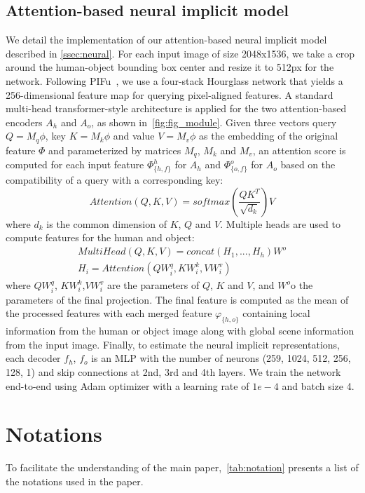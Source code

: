 \subsection{Attention-based neural implicit model}
We detail the implementation of our attention-based neural implicit model described in \cref{ssec:neural}. For each input image of size 2048x1536, we take a crop around the human-object bounding box center and resize it to 512px for the network. Following PIFu~\cite{pifu}, we use a four-stack Hourglass network that yields a 256-dimensional feature map for querying pixel-aligned features. A standard multi-head transformer-style architecture is applied for the two attention-based encoders  $A_h$ and $A_o$, as shown in~\cref{fig:fig_module}. Given three vectors query $Q=M_q\phi$, key $K=M_k\phi$ and value $V=M_v\phi$ as the embedding of the original feature $\Phi$ and parameterized by matrices $M_q$, $M_k$ and $M_v$, an attention score is computed for each input feature $\Phi^h_{\{h,f\}}$ for $A_h$ and $\Phi^o_{\{o,f\}}$ for $A_o$ based on the compatibility of a query with a corresponding key:
\begin{equation}
    Attention(Q,K,V)=softmax\left(\frac{QK^T}{\sqrt{d_k}}\right)V
\end{equation}
where $d_k$ is the common dimension of $K$, $Q$ and $V$. Multiple heads are used to compute features for the human and object:
\begin{equation}
\begin{gathered}
    MultiHead(Q, K, V)=concat(H_1, ..., H_h)W^o
    \\
    H_i=Attention(QW^q_i, KW^k_i,V W^v_i)
\end{gathered}
\end{equation}
where $QW^q_i$, $KW^k_i$,$V W^v_i$  are the parameters of $Q$, $K$ and $V$, and $W^o$o the parameters of the final projection. The final feature is computed as the mean of the processed features with each merged feature $\varphi_{\{h,o\}}$ containing local information from the human or object image along with global scene information from the input image. Finally, to estimate the neural implicit representations, each decoder $f_h$, $f_o$ is an MLP with the number of neurons (259, 1024, 512, 256, 128, 1) and skip connections at 2nd, 3rd and 4th layers. We train the network end-to-end using Adam optimizer with a learning rate of $1e-4$ and batch size 4. 
\section{Notations}
\label{sec:notations}
To facilitate the understanding of the main paper,~\cref{tab:notation} presents a list of the notations used in the paper.
